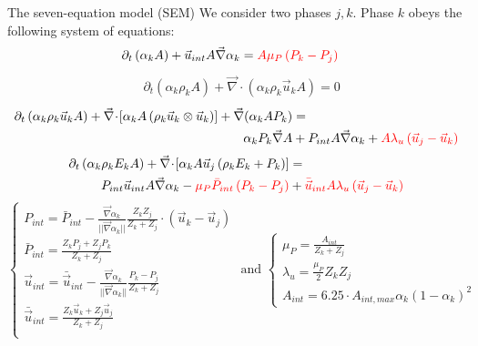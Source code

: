 \documentclass[xcolor=dvipsnames,10pt]{beamer}
\renewcommand{\div}{\vec{\nabla}\! \cdot \!}
\newcommand{\grad}{\vec{\nabla}}
\newcommand{\tcr}[1]{\textcolor{red}{#1}}
\begin{document}
\begin{frame}{The seven-equation model (SEM)}
We consider two phases ${j,k}$. Phase $k$ obeys the following system of equations:
\begin{align}
&\partial_t \left( \alpha_k  A\right) + \vec{u}_{int} A \grad \alpha_k = {\color{red}A \mu_P \left( P_k - P_j \right)} \nonumber
\end{align}
\begin{align}
&\partial_t \left( \alpha_k \rho_k A \right) + \div \left( \alpha_k \rho_k \vec{u}_k A \right) = 0 \nonumber
\end{align}
\begin{align}
\partial_t \left( \alpha_k \rho_k \vec{u}_k A \right) + \div \left[ \alpha_k A \left( \rho_k \vec{u}_k\otimes \vec{u}_k \right) \right]  + \grad(\alpha_k A P_k) &=  \nonumber \\
\alpha_k P_k \grad A &+  P_{int} A \grad \alpha_k +  {\color{red}A \lambda_u \left( \vec{u}_j - \vec{u}_k \right)} \nonumber
\end{align}
\begin{align}
\partial_t \left( \alpha_k \rho_k E_k A \right) + \div \left[ \alpha_k A \vec{u}_j \left( \rho_k E_k + P_k \right) \right] &= \nonumber\\
P_{int} \vec{u}_{int} A \grad \alpha_k - {\color{red}\mu_P \bar{P}_{int} \left( P_k-P_j \right)} &+{\color{red}\bar{\vec{u}}_{int} A \lambda_u \left( \vec{u}_j - \vec{u}_k \right)} \nonumber
\end{align}
\begin{equation}
\left\{
\begin{array}{l}
P_{int} = \bar{P}_{int} - \frac{\grad \alpha_k}{||\grad \alpha_k||} \frac{Z_k Z_j}{Z_k + Z_j} \cdot \left( \vec{u}_k-\vec{u}_j \right) \\
\bar{P}_{int} = \frac{Z_k P_j + Z_j P_k}{Z_k + Z_j} \\
\vec{u}_{int} = \bar{\vec{u}}_{int} - \frac{\grad \alpha_k}{||\grad \alpha_k||} \frac{P_k - P_j}{Z_k + Z_j} \\
\bar{\vec{u}}_{int} = \frac{Z_k \vec{u} _k + Z_j \vec{u}_j}{Z_k + Z_j} \\
\end{array}
\right.
\nonumber
\text{ and }
\left\{
\begin{array}{l}
\mu_P = \frac{A_{int}}{Z_k+Z_j} \\
\lambda_u = \frac{\mu_P}{2} Z_k Z_j \\
A_{int} = 6.25 \cdot A_{int,max} \alpha_k \left( 1-\alpha_k \right)^2
\end{array}
\right.
\end{equation}
\end{frame}
\end{document}
